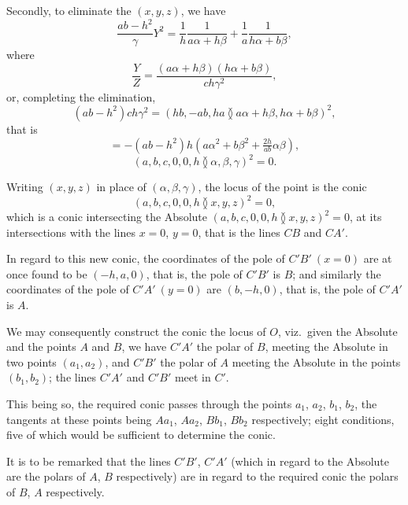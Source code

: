 \documentclass[11pt,a4paper]{article}
\theoremstyle{plain}
\begin{document}
\newpage
\setcounter{equation}{29}

Secondly, to eliminate the $(x, y, z)$, we have
\begin{equation}
\frac{ab-h^2}{\gamma}Y^2 = \frac{1}{h}\frac{1}{a\alpha + h\beta} + \frac{1}{a}\frac{1}{h\alpha + b\beta},
\end{equation}
where
\begin{equation}
\frac{Y}{Z} = \frac{(a\alpha + h\beta)(h\alpha + b\beta)}{ch\gamma^2},
\end{equation}
or, completing the elimination,
\begin{equation}
(ab-h^2)ch\gamma^2 = (hb, -ab, ha \between a\alpha + h\beta, h\alpha + b\beta)^2,
\end{equation}
that is
\begin{equation}
= -(ab-h^2)h(a\alpha^2 + b\beta^2 + \tfrac{2h}{ab}\alpha\beta),
\end{equation}
\begin{equation}
(a, b, c, 0, 0, h \between \alpha, \beta, \gamma)^2 = 0.
\end{equation}

Writing $(x, y, z)$ in place of $(\alpha, \beta, \gamma)$, the locus of the point is the conic
\begin{equation}
(a, b, c, 0, 0, h \between x, y, z)^2 = 0,
\end{equation}
which is a conic intersecting the Absolute $(a, b, c, 0, 0, h \between x, y, z)^2 = 0$, at its intersections with the lines $x = 0$, $y = 0$, that is the lines $CB$ and $CA'$.

In regard to this new conic, the coordinates of the pole of $C'B'\ (x = 0)$ are at once found to be $(-h, a, 0)$, that is, the pole of $C'B'$ is $B$; and similarly the coordinates of the pole of $C'A'\ (y = 0)$ are $(b, -h, 0)$, that is, the pole of $C'A'$ is $A$.

We may consequently construct the conic the locus of $O$, viz.~given the Absolute and the points $A$ and $B$, we have $C'A'$ the polar of $B$, meeting the Absolute in two points $(a_1, a_2)$, and $C'B'$ the polar of $A$ meeting the Absolute in the points $(b_1, b_2)$; the lines $C'A'$ and $C'B'$ meet in $C'$.

This being so, the required conic passes through the points $a_1$, $a_2$, $b_1$, $b_2$, the tangents at these points being $Aa_1$, $Aa_2$, $Bb_1$, $Bb_2$ respectively; eight conditions, five of which would be sufficient to determine the conic.

It is to be remarked that the lines $C'B'$, $C'A'$ (which in regard to the Absolute are the polars of $A$, $B$ respectively) are in regard to the required conic the polars of $B$, $A$ respectively.
\end{document}
